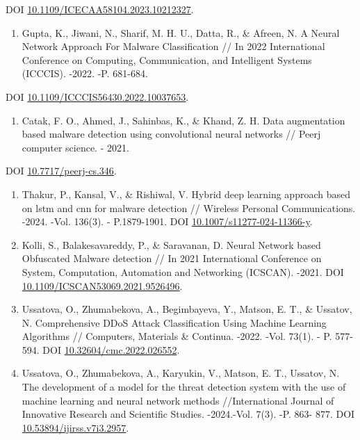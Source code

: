 \begin{references}
DOI
\href{https://doi.org/10.1109/ICECAA58104.2023.10212327}{10.1109/ICECAA58104.2023.10212327}.

\begin{enumerate}
\def\labelenumi{\arabic{enumi}.}
\setcounter{enumi}{15}
\item
  Gupta, K., Jiwani, N., Sharif, M. H. U., Datta, R., \& Afreen, N. A
  Neural Network Approach For Malware Classification // In 2022
  International Conference on Computing, Communication, and Intelligent
  Systems (ICCCIS). -2022. -P. 681-684.
\end{enumerate}

DOI
\href{https://doi.org/10.1109/ICCCIS56430.2022.10037653}{10.1109/ICCCIS56430.2022.10037653}.

\begin{enumerate}
\def\labelenumi{\arabic{enumi}.}
\setcounter{enumi}{16}
\item
  Catak, F. O., Ahmed, J., Sahinbas, K., \& Khand, Z. H. Data
  augmentation based malware detection using convolutional neural
  networks // Peerj computer science. - 2021.
\end{enumerate}

DOI \href{https://doi.org/10.7717/peerj-cs.346}{10.7717/peerj-cs.346}.

\begin{enumerate}
\def\labelenumi{\arabic{enumi}.}
\setcounter{enumi}{17}
\item
  Thakur, P., Kansal, V., \& Rishiwal, V. Hybrid deep learning approach
  based on lstm and cnn for malware detection // Wireless Personal
  Communications. -2024. -Vol. 136(3). - P.1879-1901. DOI
  \href{https://doi.org/10.1007/s11277-024-11366-y}{10.1007/s11277-024-11366-y}.
\item
  Kolli, S., Balakesavareddy, P., \& Saravanan, D. Neural Network based
  Obfuscated Malware detection // In 2021 International Conference on
  System, Computation, Automation and Networking (ICSCAN). -2021. DOI
  \href{https://doi.org/10.1109/ICSCAN53069.2021.9526496}{10.1109/ICSCAN53069.2021.9526496}.
\item
  Ussatova, O., Zhumabekova, A., Begimbayeva, Y., Matson, E. T., \&
  Ussatov, N. Comprehensive DDoS Attack Classification Using Machine
  Learning Algorithms // Computers, Materials \& Continua. -2022. -Vol.
  73(1). - P. 577-594. DOI
  \href{https://doi.org/10.32604/cmc.2022.026552}{10.32604/cmc.2022.026552}.
\item
  Ussatova, O., Zhumabekova, A., Karyukin, V., Matson, E. T., Ussatov,
  N. The development of a model for the threat detection system with the
  use of machine learning and neural network methods //International
  Journal of Innovative Research and Scientific Studies. -2024.-Vol.
  7(3). -P. 863- 877. DOI
  \href{https://doi.org/10.53894/ijirss.v7i3.2957}{10.53894/ijirss.v7i3.2957}.
\end{enumerate}
\end{references}

